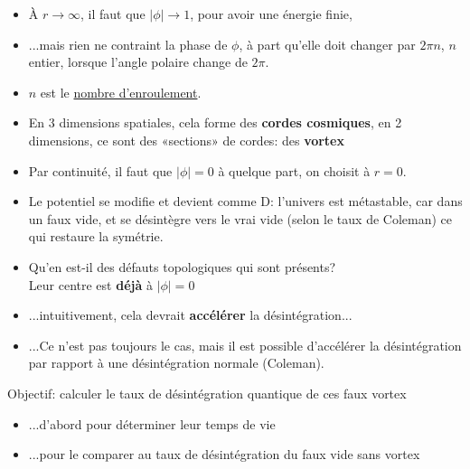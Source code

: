 \documentclass{beamer}
\begin{document}
\begin{frame}
\begin{itemize}
\item À $r\rightarrow \infty$, il faut que $|\phi| \rightarrow 1$, pour avoir une énergie finie,
\item ...mais rien ne contraint la phase de $\phi$, à part qu'elle doit changer par $2\pi n$, $n$ entier, lorsque l'angle polaire change de $2\pi$. 
\item $n$ est le \underline{nombre d'enroulement}.
\item En 3 dimensions spatiales, cela forme des \textbf{cordes cosmiques}, en 2 dimensions, ce sont des «sections» de cordes: des \textbf{vortex}
\item Par continuité, il faut que $|\phi| =0$ à quelque part, on choisit à $r=0$.
\end{itemize}
\end{frame}



\begin{frame}
\begin{itemize}
\item Le potentiel se modifie et devient comme D: l'univers est métastable, car dans un faux vide, et se désintègre vers le vrai vide (selon le taux de Coleman) ce qui restaure la symétrie.
\item Qu'en est-il des défauts topologiques qui sont présents?\\
      Leur centre est \textbf{déjà} à $|\phi|=0$\\
\item ...intuitivement, cela devrait \textbf{accélérer} la désintégration...
\item...Ce n'est pas toujours le cas, mais il est possible d'accélérer la désintégration par rapport à une désintégration normale (Coleman).
\end{itemize}
\end{frame}



\begin{frame}
Objectif: calculer le taux de désintégration quantique de ces faux vortex
\begin{itemize}
\item<2-> ...d'abord pour déterminer leur temps de vie
\item<2-> ...pour le comparer au taux de désintégration du faux vide sans vortex
\end{itemize}
\end{frame}
\end{document}
